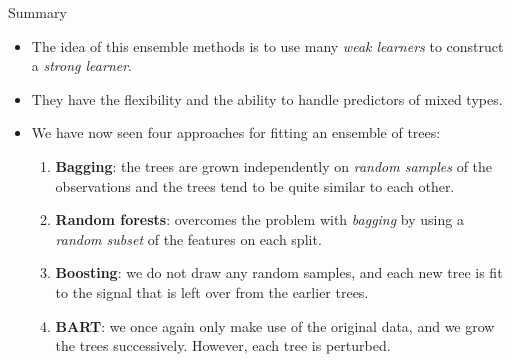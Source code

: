 \begin{frame}{Summary}
\begin{itemize}
    \item The idea of this ensemble methods is to use many \textit{weak learners} to construct a \textit{strong learner}. \pause 

    \item They have the flexibility and the ability to handle predictors of mixed types. \pause 

    \item We have now seen four approaches for fitting an ensemble of trees:

    \begin{enumerate}
        \item \textbf{Bagging}: the trees are grown independently on \textit{random samples} of the observations and the trees tend to be quite similar to each other. \pause 

        \item \textbf{Random forests}: overcomes the problem with \textit{bagging} by using a \textit{random subset} of the features on each split. \pause 

        \item \textbf{Boosting}: we do not draw any random samples, and each new tree is fit to the signal that is left over from the earlier trees. \pause 

        \item \textbf{BART}: we once again only make use of the original data, and we grow the trees successively. However, each tree is perturbed. 
    \end{enumerate}

\end{itemize}
    
\end{frame}
